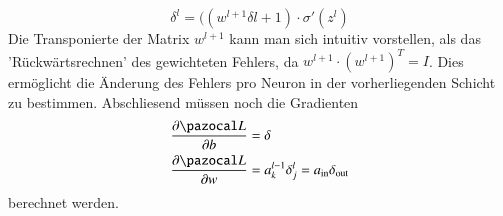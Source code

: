 \begin{equation}
\delta^{l} = ((w^{l+1} \delta{l+1}) \cdot \sigma'(z^l)
\end{equation}
Die Transponierte der Matrix $w^{l+1}$ kann man sich intuitiv vorstellen, als das 'Rückwärtsrechnen' des gewichteten Fehlers, da $w^{l+1} \cdot (w^{l+1})^T = I$. Dies ermöglicht die Änderung des Fehlers pro Neuron in der vorherliegenden Schicht zu bestimmen. Abschliesend müssen noch die Gradienten
\begin{equation}
\begin{split}
\frac{\partial \Lb}{\partial b} & = \delta \\
\frac{\partial \Lb}{\partial w} & = a^{l-1}_{k} \delta^{l}_j = a_{\text{in}} \delta_{\text{out}}
\end{split}
\end{equation}
berechnet werden.
